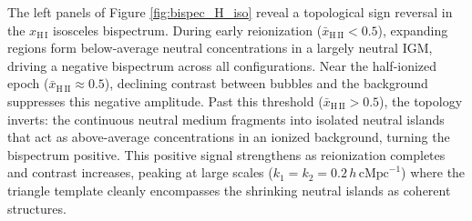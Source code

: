 \documentclass[apj,twocolumn, appendixfloats, twocolappendix, numberedappendix, tighten]{openjournal}
\begin{document}

The left panels of Figure \ref{fig:bispec_H_iso} reveal a topological sign reversal in the $x_\mathrm{H\,I}$ isosceles bispectrum. During early reionization ($\bar{x}_\mathrm{H\,II} < 0.5$), expanding  regions form below-average neutral concentrations in a largely neutral IGM, driving a negative bispectrum across all configurations. Near the half-ionized epoch ($\bar{x}_\mathrm{H\,II} \approx 0.5$), declining contrast between bubbles and the background suppresses this negative amplitude. Past this threshold ($\bar{x}_\mathrm{H\,II} > 0.5$), the topology inverts: the continuous neutral medium fragments into isolated neutral islands that act as above-average concentrations in an ionized background, turning the bispectrum positive. This positive signal strengthens as reionization completes and contrast increases, peaking at large scales ($k_1 = k_2 = 0.2\,h\,\mathrm{cMpc}^{-1}$) where the triangle template cleanly encompasses the shrinking neutral islands as coherent structures.
\end{document}
